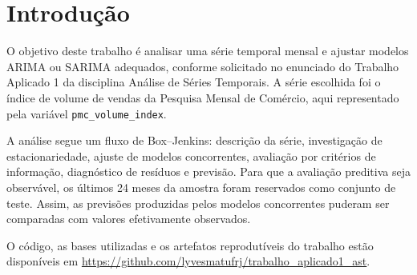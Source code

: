 ﻿\section{Introdução}

O objetivo deste trabalho é analisar uma série temporal mensal e ajustar modelos ARIMA ou SARIMA adequados, conforme solicitado no enunciado do Trabalho Aplicado 1 da disciplina Análise de Séries Temporais. A série escolhida foi o índice de volume de vendas da Pesquisa Mensal de Comércio, aqui representado pela variável \texttt{pmc\_volume\_index}.

A análise segue um fluxo de Box--Jenkins: descrição da série, investigação de estacionariedade, ajuste de modelos concorrentes, avaliação por critérios de informação, diagnóstico de resíduos e previsão. Para que a avaliação preditiva seja observável, os últimos 24 meses da amostra foram reservados como conjunto de teste. Assim, as previsões produzidas pelos modelos concorrentes puderam ser comparadas com valores efetivamente observados.

O código, as bases utilizadas e os artefatos reprodutíveis do trabalho estão disponíveis em \url{https://github.com/lyvesmatufrj/trabalho_aplicado1_ast}.

